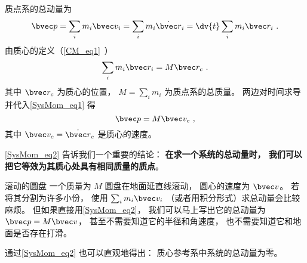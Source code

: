 

质点系的总动量为
\begin{equation}\label{SysMom_eq1}
\bvec p = \sum_i m_i \bvec v_i = \sum_i m_i \dot{\bvec r}_i = \dv{t}  \sum_i m_i \bvec r_i~.
\end{equation}
由质心的定义（\autoref{CM_eq1}~） 
\begin{equation}
\sum_i m_i \bvec r_i = M \bvec r_c~.
\end{equation}
其中 $\bvec r_c$ 为质心的位置， $M = \sum_i m_i$ 为质点系的总质量。 两边对时间求导并代入\autoref{SysMom_eq1} 得
\begin{equation}\label{SysMom_eq2}
\bvec p = M\bvec v_c~,
\end{equation}
其中 $\bvec v_c = \dot{\bvec r}_c$ 是质心的速度。

\autoref{SysMom_eq2} 告诉我们一个重要的结论： \textbf{在求一个系统的总动量时， 我们可以把它等效为其质心处具有相同质量的质点}。

\begin{example}{滚动的圆盘}
一个质量为 $M$ 圆盘在地面延直线滚动， 圆心的速度为 $\bvec v$。 若将其分割为许多小份， 使用 $\sum_i m_i \bvec v_i$ （或者用积分形式）求总动量会比较麻烦。 但如果直接用\autoref{SysMom_eq2}， 我们可以马上写出它的总动量为 $\bvec p = M\bvec v$， 甚至不需要知道它的半径和角速度， 也不需要知道它和地面是否存在打滑。
\end{example}

通过\autoref{SysMom_eq2} 也可以直观地得出： 质心参考系中系统的总动量为零。
